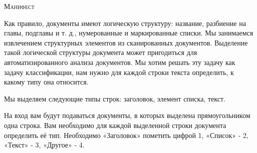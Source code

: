 \documentclass[a4paper,12pt]{article}
\begin{document}
\textsc{\large Манифест}

\vspace{0.5cm}

Как правило, документы имеют логическую структуру: название, разбиение на главы, подглавы и т. д., нумерованные и маркированные списки. Мы занимаемся извлечением структурных элементов из сканированных документов. Выделение такой логической структуры документа может пригодиться для автоматизированного анализа документов. Мы хотим решать эту задачу как задачу классификации, нам нужно для каждой строки текста определить, к какому типу она относится.

Мы выделяем следующие типы строк: заголовок, элемент списка, текст.

На вход вам будут подаваться документы, в которых выделена прямоугольником одна строка. Вам необходимо для каждой выделенной строки документа определить её тип. Необходимо «Заголовок» пометить цифрой 1, «Список» - 2, «Текст» - 3, «Другое» - 4.
\end{document}
